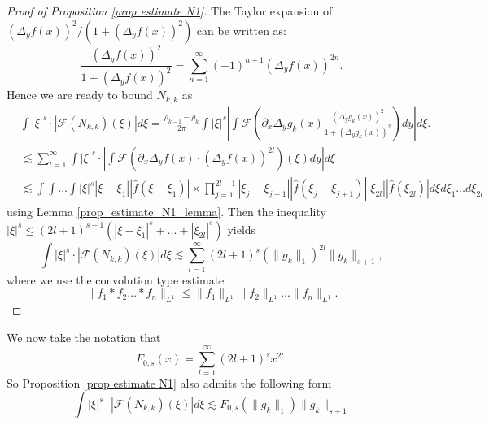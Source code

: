 \documentclass[11pt]{article}
\theoremstyle{definition}
\numberwithin{equation}{section}
\begin{document}
\begin{proof}[Proof of Proposition \ref{prop estimate N1}]
The Taylor expansion of $(\Delta_yf(x))^2/(1+(\Delta_yf(x))^2)$ can be written as:
\begin{equation*}
    \frac{(\Delta_yf(x))^2}{1+(\Delta_yf(x))^2}=\sum\limits_{n=1}^{\infty}(-1)^{n+1}(\Delta_yf(x))^{2n}.
\end{equation*}
Hence we are ready to bound $N_{k,k}$ as
\begin{align}
   &\int|\xi|^s\cdot|\mathscr{F}(N_{k,k})(\xi)|d\xi=\frac{\rho_{k-1}-\rho_k}{2\pi}\int |\xi|^s\left|\int\mathscr{F}\left(\partial_x\Delta_yg_k(x)\frac{(\Delta_yg_k(x))^2}{1+(\Delta_yg_k(x))^2}\right)dy\right|d\xi.\\
   &\lesssim\sum_{l=1}^{\infty}\int|\xi|^s\cdot\left|\int \mathscr{F}(\partial_x\Delta_yf(x)\cdot(\Delta_yf(x))^{2l})
        (\xi)dy\right|d\xi\\
    &\lesssim\int\int\dots\int|\xi|^s|\xi-\xi_1||\hat{f}(\xi-\xi_1)|\times\prod_{j=1}^{2l-1}|\xi_j-\xi_{j+1}||\hat{f}(\xi_j-\xi_{j+1})||\xi_{2l}||\hat{f}(\xi_{2l})|d\xi d\xi_1\dots d\xi_{2l}
\end{align}
using Lemma \ref{prop_estimate_N1_lemma}. Then the inequality $|\xi|^s\leq(2l+1)^{s-1}(|\xi-\xi_1|^s+\dots+|\xi_{2l}|^s)$ yields
\begin{equation}
    \int|\xi|^s\cdot|\mathscr{F}(N_{k,k})(\xi)|d\xi \lesssim\sum\limits_{l=1}^{\infty}(2l+1)^s(\|g_k\|_1)^{2l}\|g_k\|_{s+1},
\end{equation}
where we use the convolution type estimate
\begin{equation}\label{ineq_convolution}
    \|f_1*f_2\dots*f_n\|_{L^1}\leq\|f_1\|_{L^1}\|f_2\|_{L^1}\dots\|f_n\|_{L^1}.
\end{equation}
\end{proof}
We now take the notation that
\begin{equation}\label{def F 0s}
     F_{0,s}(x)=\sum\limits_{l=1}^{\infty}(2l+1)^sx^{2l}.
\end{equation}
So Proposition \ref{prop estimate N1} also admits the following form
\begin{equation}
    \int|\xi|^s\cdot|\mathscr{F}(N_{k,k})(\xi)|d\xi\lesssim F_{0,s}(\|g_k\|_1)\|g_k\|_{s+1}
\end{equation}
\end{document}
